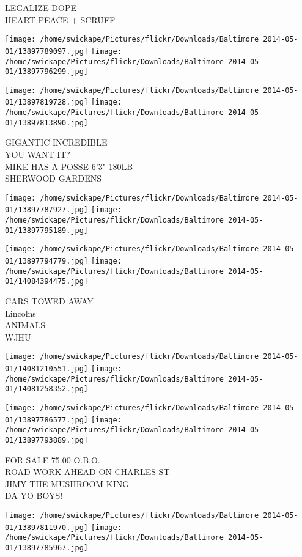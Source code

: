 \documentclass[10pt,letterpaper]{article}
\begin{document}
LEGALIZE DOPE\\
HEART PEACE + SCRUFF
\pagebreak

\texttt{[image: /home/swickape/Pictures/flickr/Downloads/Baltimore 2014-05-01/13897789097.jpg]}
\texttt{[image: /home/swickape/Pictures/flickr/Downloads/Baltimore 2014-05-01/13897796299.jpg]}

\texttt{[image: /home/swickape/Pictures/flickr/Downloads/Baltimore 2014-05-01/13897819728.jpg]}
\texttt{[image: /home/swickape/Pictures/flickr/Downloads/Baltimore 2014-05-01/13897813890.jpg]}

GIGANTIC INCREDIBLE\\
YOU WANT IT?\\
MIKE HAS A POSSE 6'3" 180LB\\
SHERWOOD GARDENS
\pagebreak

\texttt{[image: /home/swickape/Pictures/flickr/Downloads/Baltimore 2014-05-01/13897787927.jpg]}
\texttt{[image: /home/swickape/Pictures/flickr/Downloads/Baltimore 2014-05-01/13897795189.jpg]}

\texttt{[image: /home/swickape/Pictures/flickr/Downloads/Baltimore 2014-05-01/13897794779.jpg]}
\texttt{[image: /home/swickape/Pictures/flickr/Downloads/Baltimore 2014-05-01/14084394475.jpg]}

CARS TOWED AWAY\\
Lincolns\\
ANIMALS\\
WJHU
\pagebreak

\texttt{[image: /home/swickape/Pictures/flickr/Downloads/Baltimore 2014-05-01/14081210551.jpg]}
\texttt{[image: /home/swickape/Pictures/flickr/Downloads/Baltimore 2014-05-01/14081258352.jpg]}

\texttt{[image: /home/swickape/Pictures/flickr/Downloads/Baltimore 2014-05-01/13897786577.jpg]}
\texttt{[image: /home/swickape/Pictures/flickr/Downloads/Baltimore 2014-05-01/13897793889.jpg]}

FOR SALE 75.00 O.B.O.\\
ROAD WORK AHEAD ON CHARLES ST\\
JIMY THE MUSHROOM KING\\
DA YO BOYS!
\pagebreak

\texttt{[image: /home/swickape/Pictures/flickr/Downloads/Baltimore 2014-05-01/13897811970.jpg]}
\texttt{[image: /home/swickape/Pictures/flickr/Downloads/Baltimore 2014-05-01/13897785967.jpg]}
\end{document}
